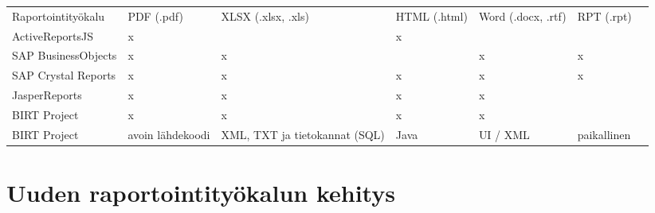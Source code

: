 \begin{table}[]
\begin{tabular}{lllllll}
Raportointityökalu  & PDF (.pdf)       & XLSX (.xlsx, .xls)            & HTML (.html) & Word (.docx, .rtf) & RPT (.rpt)  &  \\
ActiveReportsJS     & x                &                               & x            &                    &             &  \\
SAP BusinessObjects & x                & x                             &              & x                  & x           &  \\
SAP Crystal Reports & x                & x                             & x            & x                  & x           &  \\
JasperReports       & x                & x                             & x            & x                  &             &  \\
BIRT Project        & x                & x                             & x            & x                  &             &  \\
BIRT Project        & avoin lähdekoodi & XML, TXT ja tietokannat (SQL) & Java         & UI / XML           & paikallinen & 
\end{tabular}
\end{table}



\section{Uuden raportointityökalun kehitys}

